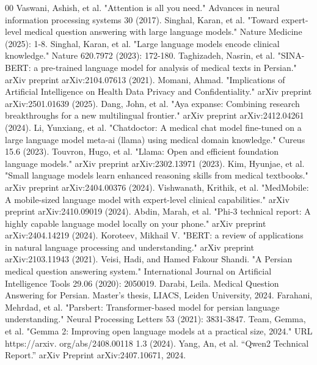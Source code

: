\documentclass[conference]{IEEEtran}
\begin{document}
	\begin{thebibliography}{00}
		Vaswani, Ashish, et al. "Attention is all you need." Advances in neural information processing systems 30 (2017).
		Singhal, Karan, et al. "Toward expert-level medical question answering with large language models." Nature Medicine (2025): 1-8.
		Singhal, Karan, et al. "Large language models encode clinical knowledge." Nature 620.7972 (2023): 172-180.
		Taghizadeh, Nasrin, et al. "SINA-BERT: a pre-trained language model for analysis of medical texts in Persian." arXiv preprint arXiv:2104.07613 (2021).
             Momani, Ahmad. "Implications of Artificial Intelligence on Health Data Privacy and Confidentiality." arXiv preprint arXiv:2501.01639 (2025).
		Dang, John, et al. "Aya expanse: Combining research breakthroughs for a new multilingual frontier." arXiv preprint arXiv:2412.04261 (2024).
		Li, Yunxiang, et al. "Chatdoctor: A medical chat model fine-tuned on a large language model meta-ai (llama) using medical domain knowledge." Cureus 15.6 (2023).
		Touvron, Hugo, et al. "Llama: Open and efficient foundation language models." arXiv preprint arXiv:2302.13971 (2023).
		Kim, Hyunjae, et al. "Small language models learn enhanced reasoning skills from medical textbooks." arXiv preprint arXiv:2404.00376 (2024).
		Vishwanath, Krithik, et al. "MedMobile: A mobile-sized language model with expert-level clinical capabilities." arXiv preprint arXiv:2410.09019 (2024).
		Abdin, Marah, et al. "Phi-3 technical report: A highly capable language model locally on your phone." 
		arXiv preprint arXiv:2404.14219 (2024).
		Koroteev, Mikhail V. "BERT: a review of applications in natural language processing and understanding." arXiv preprint arXiv:2103.11943 (2021).
		Veisi, Hadi, and Hamed Fakour Shandi. "A Persian medical question answering system." International Journal on Artificial Intelligence Tools 29.06 (2020): 2050019. 
		Darabi, Leila. Medical Question Answering for Persian. Master’s thesis, LIACS, Leiden University, 2024.
		Farahani, Mehrdad, et al. "Parsbert: Transformer-based model for persian language understanding." Neural Processing Letters 53 (2021): 3831-3847.
		Team, Gemma, et al. "Gemma 2: Improving open language models at a practical size, 2024." URL https://arxiv. org/abs/2408.00118 1.3 (2024).
		Yang, An, et al. “Qwen2 Technical Report.” arXiv Preprint arXiv:2407.10671, 2024.

\end{thebibliography}
\end{document}
